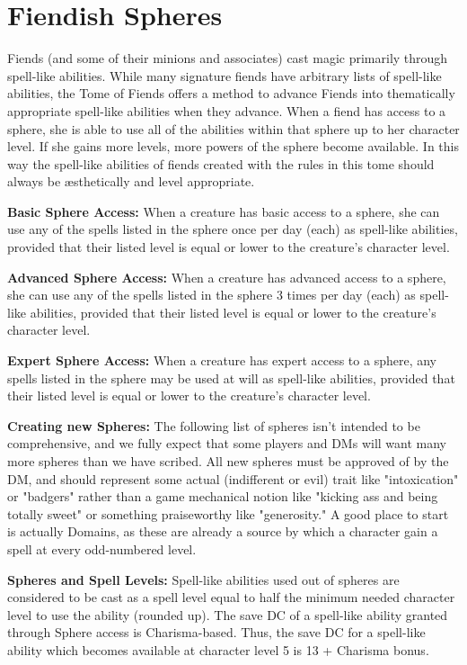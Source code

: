 \pagebreak

\section{Fiendish Spheres}

Fiends (and some of their minions and associates) cast magic primarily through spell-like abilities. While many signature fiends have arbitrary lists of spell-like abilities, the Tome of Fiends offers a method to advance Fiends into thematically appropriate spell-like abilities when they advance. When a fiend has access to a sphere, she is able to use all of the abilities within that sphere up to her character level. If she gains more levels, more powers of the sphere become available. In this way the spell-like abilities of fiends created with the rules in this tome should always be æsthetically and level appropriate.

\textbf{Basic Sphere Access:} When a creature has basic access to a sphere, she can use any of the spells listed in the sphere once per day (each) as spell-like abilities, provided that their listed level is equal or lower to the creature's character level.

\textbf{Advanced Sphere Access:} When a creature has advanced access to a sphere, she can use any of the spells listed in the sphere 3 times per day (each) as spell-like abilities, provided that their listed level is equal or lower to the creature's character level.

\textbf{Expert Sphere Access:} When a creature has expert access to a sphere, any spells listed in the sphere may be used at will as spell-like abilities, provided that their listed level is equal or lower to the creature's character level.

\textbf{Creating new Spheres:} The following list of spheres isn't intended to be comprehensive, and we fully expect that some players and DMs will want many more spheres than we have scribed. All new spheres must be approved of by the DM, and should represent some actual (indifferent or evil) trait like "intoxication" or "badgers" rather than a game mechanical notion like "kicking ass and being totally sweet" or something praiseworthy like "generosity." A good place to start is actually Domains, as these are already a source by which a character gain a spell at every odd-numbered level.

\textbf{Spheres and Spell Levels:} Spell-like abilities used out of spheres are considered to be cast as a spell level equal to half the minimum needed character level to use the ability (rounded up). The save DC of a spell-like ability granted through Sphere access is Charisma-based. Thus, the save DC for a spell-like ability which becomes available at character level 5 is 13 + Charisma bonus.

